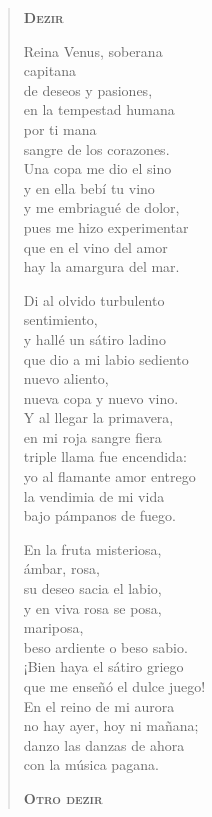 \documentclass[12pt]{article}
\begin{document}
\clearpage
{}
\begin{verse}

{\bfseries\scshape {Dezir}}

Reina Venus, soberana\\
capitana\\
de deseos y pasiones,\\
en la tempestad humana\\
por ti mana\\
sangre de los corazones.\\
Una copa me dio el sino\\
y en ella bebí tu vino\\
y me embriagué de dolor,\\
pues me hizo experimentar\\
que en el vino del amor\\
hay la amargura del mar.  

Di al olvido turbulento\\
sentimiento,\\
y hallé un sátiro ladino\\
que dio a mi labio sediento\\
nuevo aliento,\\
nueva copa y nuevo vino.\\
Y al llegar la primavera,\\
en mi roja sangre fiera\\
triple llama fue encendida:\\
yo al flamante amor entrego\\
la vendimia de mi vida\\
bajo pámpanos de fuego.  

En la fruta misteriosa,\\
ámbar, rosa,\\
su deseo sacia el labio,\\
y en viva rosa se posa,\\
mariposa,\\
beso ardiente o beso sabio.\\
¡Bien haya el sátiro griego\\
que me enseñó el dulce juego!\\
En el reino de mi aurora\\
no hay ayer, hoy ni mañana;\\
danzo las danzas de ahora\\
con la música pagana.  

{\bfseries\scshape {Otro dezir}}


\end{verse}
\end{document}
